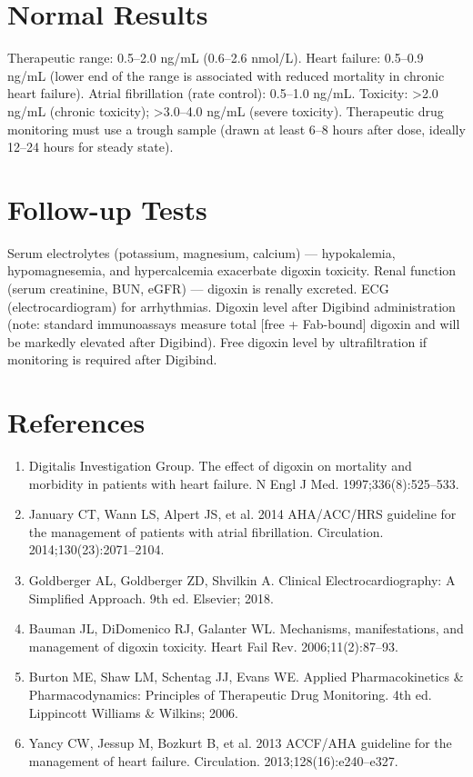\section*{Normal Results}
Therapeutic range: 0.5--2.0 ng/mL (0.6--2.6 nmol/L). Heart failure: 0.5--0.9 ng/mL (lower end of the range is associated with reduced mortality in chronic heart failure). Atrial fibrillation (rate control): 0.5--1.0 ng/mL. Toxicity: >2.0 ng/mL (chronic toxicity); >3.0--4.0 ng/mL (severe toxicity). Therapeutic drug monitoring must use a trough sample (drawn at least 6--8 hours after dose, ideally 12--24 hours for steady state).

\section*{Follow-up Tests}
Serum electrolytes (potassium, magnesium, calcium) --- hypokalemia, hypomagnesemia, and hypercalcemia exacerbate digoxin toxicity. Renal function (serum creatinine, BUN, eGFR) --- digoxin is renally excreted. ECG (electrocardiogram) for arrhythmias. Digoxin level after Digibind administration (note: standard immunoassays measure total [free + Fab-bound] digoxin and will be markedly elevated after Digibind). Free digoxin level by ultrafiltration if monitoring is required after Digibind.

\section*{References}
\begin{enumerate}
  \item Digitalis Investigation Group. The effect of digoxin on mortality and morbidity in patients with heart failure. N Engl J Med. 1997;336(8):525--533.
  \item January CT, Wann LS, Alpert JS, et al. 2014 AHA/ACC/HRS guideline for the management of patients with atrial fibrillation. Circulation. 2014;130(23):2071--2104.
  \item Goldberger AL, Goldberger ZD, Shvilkin A. Clinical Electrocardiography: A Simplified Approach. 9th ed. Elsevier; 2018.
  \item Bauman JL, DiDomenico RJ, Galanter WL. Mechanisms, manifestations, and management of digoxin toxicity. Heart Fail Rev. 2006;11(2):87--93.
  \item Burton ME, Shaw LM, Schentag JJ, Evans WE. Applied Pharmacokinetics \& Pharmacodynamics: Principles of Therapeutic Drug Monitoring. 4th ed. Lippincott Williams \& Wilkins; 2006.
  \item Yancy CW, Jessup M, Bozkurt B, et al. 2013 ACCF/AHA guideline for the management of heart failure. Circulation. 2013;128(16):e240--e327.
\end{enumerate}

\clearpage
